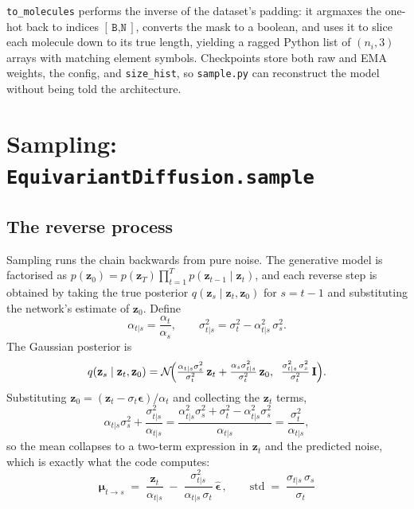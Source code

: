 \documentclass[11pt,a4paper]{article}
\newcommand{\shape}[1]{\ensuremath{[\,\texttt{#1}\,]}}
\newcommand{\code}[1]{\texttt{#1}}
\newcommand{\bz}{\mathbf{z}}
\newcommand{\bm}{\boldsymbol{\epsilon}}
\begin{document}
\noindent
\code{to\_molecules} performs the inverse of the dataset's padding: it argmaxes
the one-hot back to indices \shape{B,N}, converts the mask to a boolean, and uses
it to slice each molecule down to its true length, yielding a ragged Python list
of $(n_i,3)$ arrays with matching element symbols. Checkpoints store both raw and
EMA weights, the config, and \code{size\_hist}, so \code{sample.py} can
reconstruct the model without being told the architecture.

\section{Sampling: \code{EquivariantDiffusion.sample}}
\label{sec:sampling}

\subsection{The reverse process}

Sampling runs the chain backwards from pure noise. The generative model is
factorised as $p(\bz_0) = p(\bz_T)\prod_{t=1}^{T} p(\bz_{t-1}\mid\bz_t)$, and
each reverse step is obtained by taking the true posterior
$q(\bz_s\mid\bz_t,\bz_0)$ for $s=t-1$ and substituting the network's estimate of
$\bz_0$. Define
\begin{equation}
  \alpha_{t|s} = \frac{\alpha_t}{\alpha_s},
  \qquad
  \sigma^2_{t|s} = \sigma_t^2 - \alpha_{t|s}^2\,\sigma_s^2 .
\end{equation}
The Gaussian posterior is
\begin{equation}
  q(\bz_s\mid \bz_t,\bz_0)
  = \mathcal{N}\!\Bigl(
      \tfrac{\alpha_{t|s}\sigma_s^2}{\sigma_t^2}\,\bz_t
      + \tfrac{\alpha_s \sigma^2_{t|s}}{\sigma_t^2}\,\bz_0,
      \;\;
      \tfrac{\sigma^2_{t|s}\,\sigma_s^2}{\sigma_t^2}\,\mathbf{I}
    \Bigr).
\end{equation}
Substituting $\bz_0=(\bz_t-\sigma_t\bm)/\alpha_t$ and collecting the $\bz_t$
terms,
\begin{equation}
  \alpha_{t|s}\sigma_s^2 + \frac{\sigma^2_{t|s}}{\alpha_{t|s}}
  = \frac{\alpha_{t|s}^2\sigma_s^2 + \sigma_t^2 - \alpha_{t|s}^2\sigma_s^2}{\alpha_{t|s}}
  = \frac{\sigma_t^2}{\alpha_{t|s}},
\end{equation}
so the mean collapses to a two-term expression in $\bz_t$ and the predicted
noise, which is exactly what the code computes:
\begin{equation}
  \boxed{\;
  \boldsymbol{\mu}_{t\to s} \;=\; \frac{\bz_t}{\alpha_{t|s}}
    \;-\; \frac{\sigma^2_{t|s}}{\alpha_{t|s}\,\sigma_t}\,\hat{\bm}\,,
  \qquad
  \text{std} \;=\; \frac{\sigma_{t|s}\,\sigma_s}{\sigma_t}\;}
\end{equation}
\end{document}
